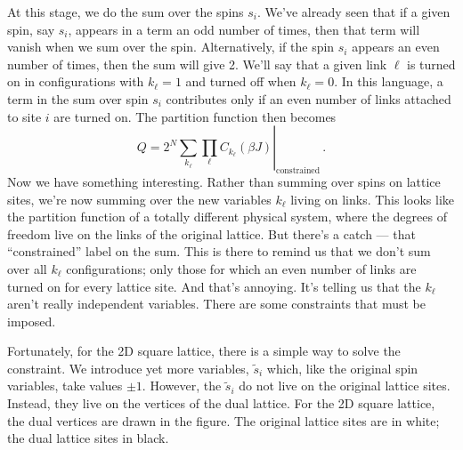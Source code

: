 \documentclass{article}
\theoremstyle{plain}\theoremheaderfont{\normalfont\bfseries}\theorembodyfont{\rmfamily}\theoremseparator{.}\newtheorem*{thm}{Theorem}\newtheorem*{law}{Law}\newtheorem*{pos}{Postulate}
\numberwithin{equation}{section}
\begin{document}
    At this stage, we do the sum over the spins \(s_i\). We've already seen that if a given spin, say \(s_i\), appears in a term an odd number of times, then that term will vanish when we sum over the spin. Alternatively, if the spin \(s_i\) appears an even number of times, then the sum will give 2. We'll say that a given link \(\ell\) is turned on in configurations with \(k_\ell = 1\) and turned off when \(k_\ell = 0\). In this language, a term in the sum over spin \(s_i\) contributes only if an even number of links attached to site \(i\) are turned on. The partition function then becomes
    \begin{equation}\label{ising_constrained_partition_function}
        Q=2^N\left.\sum_{k_\ell}\prod_{\ell}C_{k_\ell}(\beta J)\right|_{\text{constrained}}\,.
    \end{equation}
    Now we have something interesting. Rather than summing over spins on lattice sites, we're now summing over the new variables \(k_\ell\) living on links. This looks like the partition function of a totally different physical system, where the degrees of freedom live on the links of the original lattice. But there's a catch --- that ``constrained'' label on the sum. This is there to remind us that we don't sum over all \(k_\ell\) configurations; only those for which an even number of links are turned on for every lattice site. And that's annoying. It's telling us that the \(k_\ell\) aren't really independent variables. There are some constraints that must be imposed.

    Fortunately, for the 2D square lattice, there is a simple way to solve the constraint. We introduce yet more variables, \(\tilde{s}_i\) which, like the original spin variables, take values \(\pm 1\). However, the \(\tilde{s}_i\) do not live on the original lattice sites. Instead, they live on the vertices of the dual lattice. For the 2D square lattice, the dual vertices are drawn in the figure. The original lattice sites are in white; the dual lattice sites in black.
    \begin{figure}
        \centering
    \end{figure}
\end{document}
